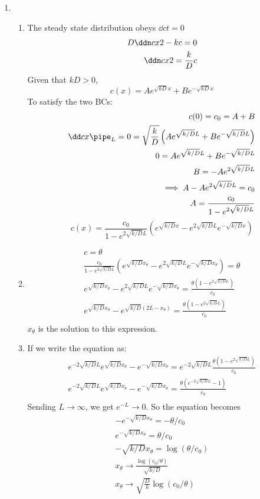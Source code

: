 \documentclass{X:/Documents/Coding/Latex/myassignment}
\begin{document}
\begin{enumerate}
	\item 
	\begin{enumerate}
		\item 
		The steady state distribution obeys $\dd ct = 0$
		\begin{align*}
			D \ddn cx2 - kc = 0\\
			\ddn cx2 = \frac kD c
		\end{align*}
		Given that $kD > 0$, 
		\[c(x) = Ae^{\sqrt{kD} x} + Be^{-\sqrt{kD} x}\]
		To satisfy the two BCs:
		\begin{align*}
			c(0) = c_0 = A+B\\
			\dd cx\pipe_L = 0 = \sqrt{\frac{k}{D}}\left(Ae^{\sqrt{k/D} L} + Be^{-\sqrt{k/D} L}\right)\\
			0 = Ae^{\sqrt{k/D} L} + Be^{-\sqrt{k/D} L}\\
			B =- Ae^{2\sqrt{k/D} L}\\
			\implies A - Ae^{2\sqrt{k/D} L} = c_0\\
			A = \frac{c_0}{1 -e^{2\sqrt{k/D} L}}
		\end{align*}
		\[c(x) = \frac{c_0}{1 -e^{2\sqrt{k/D} L}} \left(e^{\sqrt{k/D} x} - e^{2\sqrt{k/D} L} e^{-\sqrt{k/D} x}\right) \]
		\item 
		\begin{align*}
			c = \theta\\
		\frac{c_0}{1 -e^{2\sqrt{k/D} L}} \left(e^{\sqrt{k/D} x_\theta} - e^{2\sqrt{k/D} L} e^{-\sqrt{k/D} x_\theta}\right) = \theta\\
		e^{\sqrt{k/D} x_\theta} - e^{2\sqrt{k/D} L} e^{-\sqrt{k/D} x_\theta} = \frac{\theta (1 -e^{2\sqrt{k/D} L})}{c_0}\\
		e^{\sqrt{k/D} x_\theta} - e^{\sqrt{k/D} (2L-x_\theta)} = \frac{\theta (1 -e^{2\sqrt{k/D} L})}{c_0}\\
		\end{align*}
		$x_\theta$ is the solution to this expression.

		\item If we write the equation as:
		\begin{align*}
		e^{-2\sqrt{k/D} L} e^{\sqrt{k/D} x_\theta} - e^{-\sqrt{k/D} x_\theta} = e^{-2\sqrt{k/D} L} \frac{\theta (1 -e^{2\sqrt{k/D} L})}{c_0}\\		
		e^{-2\sqrt{k/D} L} e^{\sqrt{k/D} x_\theta} - e^{-\sqrt{k/D} x_\theta} =  \frac{\theta (e^{-2\sqrt{k/D} L} - 1)}{c_0}\\		
		\end{align*}
		Sending $L \to \infty$, we get $e^{-L} \to 0$. So the equation becomes
		\begin{align*}
			-e^{-\sqrt{k/D} x_\theta} = -\theta/c_0\\
			e^{-\sqrt{k/D} x_\theta} = \theta/c_0\\
			-\sqrt{k/D}x_\theta = \log(\theta/c_0)\\
			x_\theta \to \frac{\log(c_0/\theta)}{\sqrt{k/D}}\\
			x_\theta \to \sqrt{\frac{D}{k}}\log(c_0/\theta)\\
		\end{align*}


\end{enumerate}
\end{enumerate}
\end{document}
